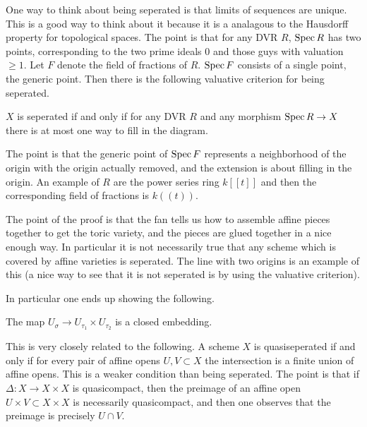 \documentclass[12pt]{article}
\begin{document}
\begin{remark}
    One way to think about being seperated is that limits of sequences are unique. This is a good way to think about it because it is a analagous to the Hausdorff property for topological spaces. The point is that for any DVR $R$, $\operatorname{Spec} R$ has two points, corresponding to the two prime ideals $0$ and those guys with valuation $\geq 1$. Let $F$ denote the field of fractions of $R$. $\operatorname{Spec} F$ consists of a single point, the generic point. Then there is the following 
    valuative criterion for being seperated. 
        
    \begin{theorem}
        $X$ is seperated if and only if for any DVR $R$ and any morphism $\operatorname{Spec} R\to X$ there is at most one way to fill in the diagram.

        \begin{center}
        \end{center}
    \end{theorem}

    The point is that the generic point of $\operatorname{Spec} F$ represents a neighborhood of the origin with the origin actually removed, and the extension is about filling in the origin. An example of $R$ are the power series ring $k[[t]]$ and then the 
    corresponding field of fractions is $k((t))$.
\end{remark}

\hfill

The point of the proof is that the fan tells us how to assemble affine pieces together to get the toric variety, and the pieces are glued together in a nice enough way. In particular it is not necessarily true that any scheme which is covered by affine varieties is seperated. The line with two origins is an example of this (a nice way to see that it is not seperated is by using the valuative criterion).

\hfill

In particular one ends up showing the following. 

\begin{lemma}
    The map $U_\sigma \to U_{\tau_1}\times U_{\tau_2}$ is a closed embedding.
\end{lemma}

This is very closely related to the following. A scheme $X$ is quasiseperated if and only if for every pair of affine opens $U,V \subset X$ the intersection is a finite union of affine opens. This is a weaker condition than being seperated. The point is that if $\Delta: X\to X\times X$ is quasicompact, then the preimage of an affine open $U\times V \subset X\times X$ is necessarily quasicompact, and then one observes that the preimage is precisely $U\cap V$.
\end{document}
